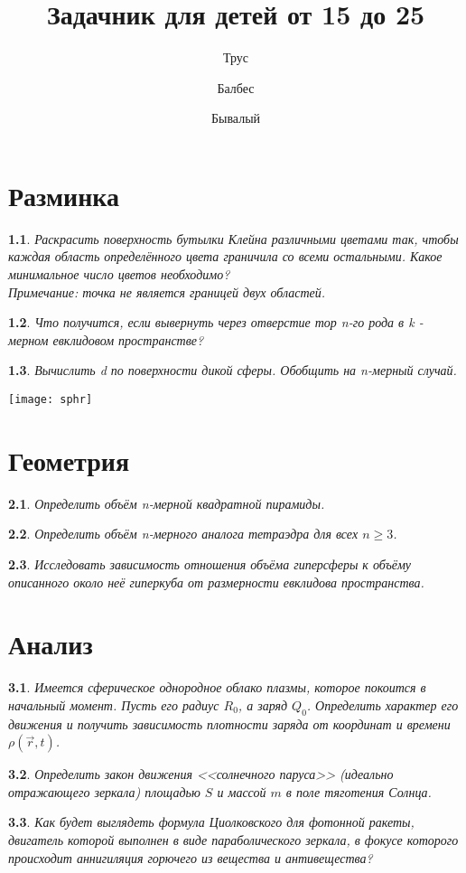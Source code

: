 \documentclass[a4paper]{book}
\author{Трус \and Балбес \and Бывалый}
\title{Задачник для детей от 15 до 25}
\theoremstyle{problemstyle}
\newtheorem{problem}{} %
\begin{document}
    \maketitle
    
    \tableofcontents
        \chapter{Разминка}
    \begin{problem}
        Раскрасить поверхность бутылки Клейна различными цветами так, чтобы каждая область определённого цвета
        граничила со всеми остальными. Какое минимальное число цветов необходимо?\\
        \textit{Примечание: точка не является границей двух областей.}
    \end{problem}   
    \begin{problem}
        Что получится, если вывернуть через отверстие тор n-го рода в k - мерном евклидовом пространстве?
    \end{problem} 
    \begin{problem}
        Вычислить \int {} d по поверхности дикой сферы. Обобщить на n-мерный случай.
    \end{problem} 
    \texttt{[image: sphr]}
    \chapter{Геометрия}
    \begin{problem}
        Определить объём n-мерной квадратной пирамиды.
    \end{problem}    
    \begin{problem}
        Определить объём n-мерного аналога тетраэдра для всех \( n \ge 3 \).
    \end{problem}
    \begin{problem}
        Исследовать зависимость отношения объёма гиперсферы к объёму описанного
        около неё гиперкуба от размерности евклидова пространства.
    \end{problem}
    \chapter{Анализ}
    \begin{problem}
        Имеется сферическое однородное облако плазмы, которое покоится в
        начальный момент. Пусть его радиус \( R_0 \), а заряд \( Q_0 \).
        Определить характер его движения и получить зависимость плотности заряда
        от координат и времени \( \rho(\vec{r}, t) \).
    \end{problem}
    \begin{problem}
        Определить закон движения <<солнечного паруса>> (идеально отражающего
        зеркала) площадью \( S \) и массой \(m\) в поле тяготения Солнца.
    \end{problem}
    \begin{problem}
        Как будет выглядеть формула Циолковского для фотонной ракеты, двигатель
        которой выполнен в виде параболического зеркала, в фокусе которого
        происходит аннигиляция горючего из вещества и антивещества?
    \end{problem}
\end{document}
